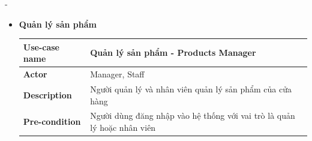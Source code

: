\begin {list} {-}{}
\begin{itemize}
        \item \textbf{Quản lý sản phẩm}
            \begin{table}[H]
                \begin{tabular}{|l|l|}
                \hline
                \textbf{Use-case name}    & \textbf{Quản lý sản phẩm - Products Manager}                                                                                                                                                                                                                                                                                                                                                                                                                                                                                                                                                                                                                                        \\ \hline
                \textbf{Actor}            & Manager, Staff                                                                                                                                                                                                                                                                                                                                                                                                                                                                                                                                                                                                                                                                      \\ \hline
                \textbf{Description}      & Người quản lý và nhân viên quản lý sản phẩm của cửa hàng                                                                                                                                                                                                                                                                                                                                                                                                                                                                                                                                                                                                                            \\ \hline
                \textbf{Pre-condition}    & Người dùng đăng nhập vào hệ thống với vai trò là quản lý hoặc nhân viên                                                                                                                                                                                                                                                                                                                                                                                                                                                                                                                                                                                                             \\ \hline

\end{tabular}
\end{table}
\end{itemize}
\end{list}

